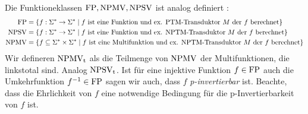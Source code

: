 Die Funktioneklassen $\mathrm{FP}, \mathrm{NPMV}, \mathrm{NPSV}$ ist analog definiert \parencite{selman_taxonomy_1994}:
\begin{align*}
    \mathrm{FP} &= \{ f: \Sigma^*\to\Sigma^* \mid \text{$f$ ist eine Funktion und ex. PTM-Transduktor $M$ der $f$ berechnet} \}\\
    \mathrm{NPSV} &= \{ f:\Sigma^*\to\Sigma^* \mid \text{$f$ ist eine Funktion und ex. NPTM-Transduktor $M$ der $f$ berechnet} \}\\
    \mathrm{NPMV} &= \{ f\subseteq \Sigma^*\times\Sigma^* \mid \text{$f$ ist eine Multifunktion und ex. NPTM-Transduktor $M$ der $f$ berechnet} \}
\end{align*}
Wir defineren $\mathrm{NPMV_t}$ als die Teilmenge von $\mathrm{NPMV}$ der Multifunktionen, die linkstotal sind. Analog $\mathrm{NPSV_t}$.
Ist für eine injektive Funktion $f\in\mathrm{FP}$ auch die Umkehrfunktion $f^{-1}\in \mathrm{FP}$ sagen wir auch, dass $f$ \emph{p-invertierbar} ist. Beachte, dass die Ehrlichkeit von $f$ eine notwendige Bedingung für die p-Invertierbarkeit von $f$ ist.


